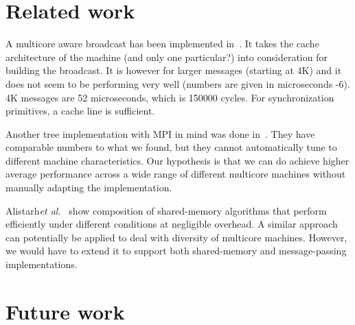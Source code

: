 \documentclass{article}
\newcommand{\etal}{{\it et al.}\xspace}
\begin{document}
\section{Related work}

A multicore aware broadcast has been implemented in~\cite{Tu2008}. It
takes the cache architecture of the machine (and only one particular?)
into consideration for building the broadcast. It is however for
larger messages (starting at 4K) and it does not seem to be performing
very well (numbers are given in microseconds -6). 4K messages are 52
microseconds, which is 150000 cycles. For synchronization primitives,
a cache line is sufficient.

Another tree implementation with MPI in mind was done
in~\cite{Graham2008}. They have comparable numbers to what we found,
but they cannot automatically tune to different machine
characteristics. Our hypothesis is that we can do achieve higher
average performance across a wide range of different multicore
machines without manually adapting the implementation.

Alistarh\etal~\cite{Alistarh2012} show composition of shared-memory
algorithms that perform efficiently under different conditions at
negligible overhead. A similar approach can potentially be applied to
deal with diversity of multicore machines. However, we would have
to extend it to support both shared-memory and message-passing
implementations. 

\section{Future work}
\end{document}
